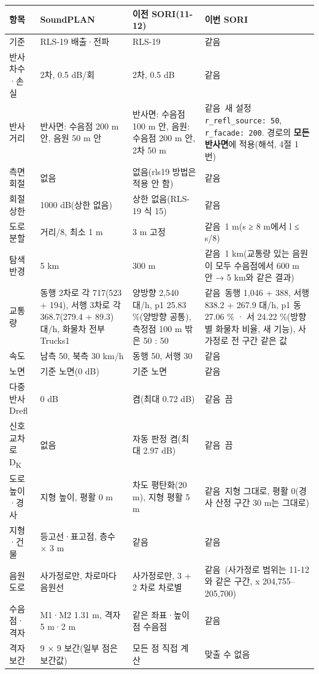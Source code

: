 \documentclass[10pt,a4paper]{article}
\newcommand{\f}[1]{\texttt{#1}}
\newcommand{\hl}[1]{\textbf{#1}}
\newcommand{\ok}{\textcolor{green!45!black}{같음}}
\newcommand{\nb}[1]{\textcolor{orange!80!black}{#1}}
\begin{document}
{\small
\begin{tabularx}{\linewidth}{@{}p{24mm}p{36mm}p{36mm}L@{}}
\toprule
항목 & SoundPLAN & 이전 SORI(11-12) & 이번 SORI \\
\midrule
기준 & RLS-19 배출·전파 & RLS-19 & \ok \\
반사 차수·손실 & 2차, 0.5 dB/회 & 2차, 0.5 dB & \ok \\
반사 거리 & 반사면: 수음점 200 m 안, 음원 50 m 안 & 반사면: 수음점 100 m 안, 음원: 수음점 200 m 안, 2차 50 m & \ok\ 새 설정 \f{r\_refl\_source: 50}, \f{r\_facade: 200}. 경로의 \hl{모든 반사면}에 적용(해석, 4절 1번) \\
측면 회절 & 없음 & 없음(rls19 방법은 적용 안 함) & \ok \\
회절 상한 & 1000 dB(상한 없음) & 상한 없음(RLS-19 식 15) & \ok \\
도로 분할 & 거리/8, 최소 1 m & 3 m 고정 & \ok\ 1 m(s ≥ 8 m에서 l ≤ s/8) \\
탐색 반경 & 5 km & 300 m & \ok\ 1 km(교통량 있는 음원이 모두 수음점에서 600 m 안 → 5 km와 같은 결과) \\
교통량 & 동행 2차로 각 717(523 + 194), 서행 3차로 각 368.7(279.4 + 89.3) 대/h, 화물차 전부 Trucks1 & 양방향 2,540 대/h, p1 25.83 \%(양방향 공통), 측정점 100 m 밖은 50 : 50 & \ok\ 동행 1,046 + 388, 서행 838.2 + 267.9 대/h, p1 동 27.06 \% · 서 24.22 \%(방향별 화물차 비율, 새 기능), 사가정로 전 구간 같은 값 \\
속도 & 남측 50, 북측 30 km/h & 동행 50, 서행 30 & \ok \\
노면 & 기준 노면(0 dB) & 기준 노면 & \ok \\
다중반사 Drefl & 0 dB & \nb{켬}(최대 0.72 dB) & \ok\ 끔 \\
신호교차로 D\textsubscript{K} & 없음 & \nb{자동 판정 켬}(최대 2.97 dB) & \ok\ 끔 \\
도로 높이·경사 & 지형 높이, 평활 0 m & \nb{차도 평탄화(20 m), 지형 평활 5 m} & \ok\ 지형 그대로, 평활 0(경사 산정 구간 30 m는 그대로) \\
지형·건물 & 등고선·표고점, 층수 × 3 m & 같음 & \ok \\
음원 도로 & 사가정로만, 차로마다 음원선 & 사가정로만, 3 + 2 차로 차로별 & \ok\ (사가정로 범위는 11-12와 같은 구간, x 204,755–205,700) \\
수음점·격자 & M1·M2 1.31 m, 격자 5 m·2 m & 같은 좌표·높이 점 수음점 & \ok \\
격자 보간 & 9 × 9 보간(일부 점은 보간값) & 모든 점 직접 계산 & \nb{맞출 수 없음} \\
\bottomrule
\end{tabularx}}
\end{document}
